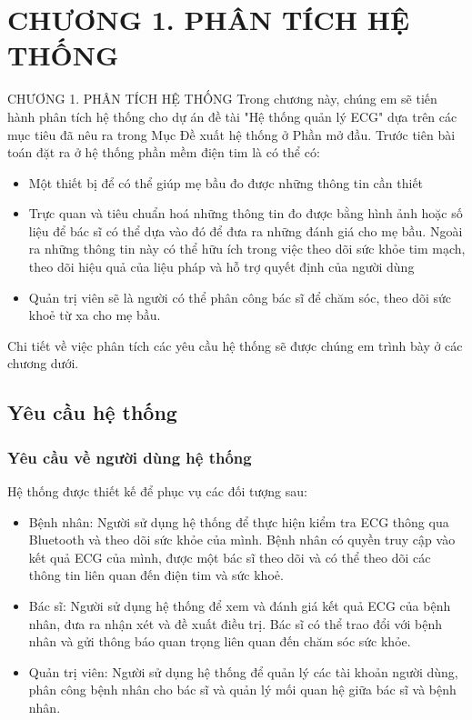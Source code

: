 
\section*{CHƯƠNG 1. PHÂN TÍCH HỆ THỐNG}
\setcounter{section}{1}
\setcounter{subsection}{0} %
\setcounter{table}{0} %
\setcounter{figure}{0} %
{\numberline{}CHƯƠNG 1. PHÂN TÍCH HỆ THỐNG}
Trong chương này, chúng em sẽ tiến hành phân tích hệ thống cho dự án đề tài "Hệ thống quản lý ECG" dựa trên các mục tiêu
đã nêu ra trong Mục Đề xuất hệ thống ở Phần mở đầu. Trước tiên bài toán đặt ra ở hệ thống phần mềm điện tim là có thể có:

\begin{itemize}
  \item Một thiết bị để có thể giúp mẹ bầu đo được những thông tin cần thiết
  \item Trực quan và tiêu chuẩn hoá những thông tin đo được
    bằng hình ảnh hoặc số liệu để bác sĩ có thể dựa vào đó để đưa ra những đánh giá cho mẹ bầu. Ngoài ra những thông tin này
    có thể hữu ích trong việc theo dõi sức khỏe tim mạch, theo dõi hiệu quả của liệu pháp 
    và hỗ trợ quyết định của người dùng
  \item Quản trị viên sẽ là người có thể phân công bác sĩ để chăm sóc, theo dõi sức khoẻ từ
  xa cho mẹ bầu. 
\end{itemize}

Chi tiết về việc phân tích các yêu cầu hệ thống sẽ được chúng em trình bày ở các chương dưới.


\subsection{Yêu cầu hệ thống}
\subsubsection{Yêu cầu về người dùng hệ thống}
Hệ thống được thiết kế để phục vụ các đối tượng sau:
\begin{itemize}
    \item Bệnh nhân: Người sử dụng hệ thống để thực hiện kiểm tra ECG thông qua Bluetooth và theo dõi sức khỏe của mình. Bệnh nhân có quyền truy cập vào kết quả ECG của mình, được một bác sĩ theo dõi và có thể theo dõi các thông tin liên quan đến điện tim và sức khoẻ.
    \item Bác sĩ: Người sử dụng hệ thống để xem và đánh giá kết quả ECG của bệnh nhân, đưa ra nhận xét và đề xuất điều trị. Bác sĩ có thể trao đổi với bệnh nhân và gửi thông báo quan trọng liên quan đến chăm sóc sức khỏe.
    \item Quản trị viên: Người sử dụng hệ thống để quản lý các tài khoản người dùng, phân công bệnh nhân cho bác sĩ và quản lý mối quan hệ giữa bác sĩ và bệnh nhân.
\end{itemize}

